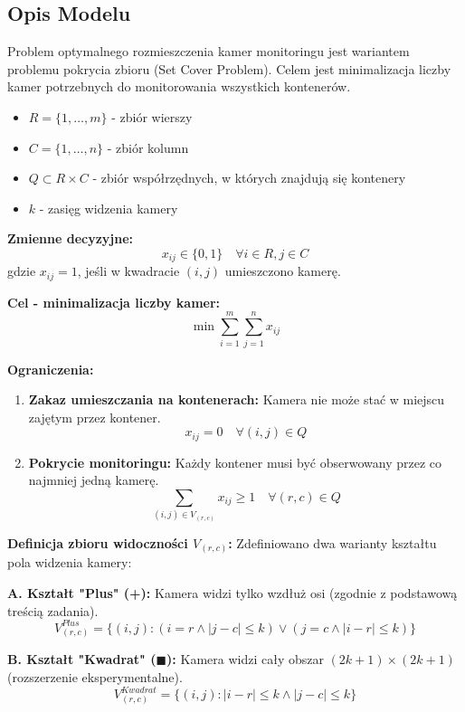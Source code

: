 \documentclass[11pt, a4paper]{article}
\begin{document}
\subsection{Opis Modelu}
Problem optymalnego rozmieszczenia kamer monitoringu jest wariantem problemu pokrycia zbioru (Set Cover Problem). Celem jest minimalizacja liczby kamer potrzebnych do monitorowania wszystkich kontenerów.

\begin{itemize}
    \item $R = \{1, \dots, m\}$ - zbiór wierszy
    \item $C = \{1, \dots, n\}$ - zbiór kolumn
    \item $Q \subset R \times C$ - zbiór współrzędnych, w których znajdują się kontenery
    \item $k$ - zasięg widzenia kamery
\end{itemize}

\noindent \textbf{Zmienne decyzyjne:}
$$ x_{ij} \in \{0, 1\} \quad \forall i \in R, j \in C $$
gdzie $x_{ij} = 1$, jeśli w kwadracie $(i, j)$ umieszczono kamerę.

\noindent \textbf{Cel - minimalizacja liczby kamer:}
$$ \min \sum_{i=1}^{m} \sum_{j=1}^{n} x_{ij} $$

\noindent \textbf{Ograniczenia:}
\begin{enumerate}
    \item \textbf{Zakaz umieszczania na kontenerach:} Kamera nie może stać w miejscu zajętym przez kontener.
    $$ x_{ij} = 0 \quad \forall (i, j) \in Q $$
    
    \item \textbf{Pokrycie monitoringu:} Każdy kontener musi być obserwowany przez co najmniej jedną kamerę.
    $$ \sum_{(i, j) \in V_{(r,c)}} x_{ij} \ge 1 \quad \forall (r, c) \in Q $$
\end{enumerate}

\noindent \textbf{Definicja zbioru widoczności $V_{(r,c)}$:}
Zdefiniowano dwa warianty kształtu pola widzenia kamery:

\textbf{A. Kształt "Plus" (+):} Kamera widzi tylko wzdłuż osi (zgodnie z podstawową treścią zadania).
$$ V^{Plus}_{(r,c)} = \{ (i,j) : (i=r \land |j-c| \le k) \lor (j=c \land |i-r| \le k) \} $$

\textbf{B. Kształt "Kwadrat" ($\blacksquare$):} Kamera widzi cały obszar $(2k+1) \times (2k+1)$ (rozszerzenie eksperymentalne).
$$ V^{Kwadrat}_{(r,c)} = \{ (i,j) : |i-r| \le k \land |j-c| \le k \} $$
\end{document}
